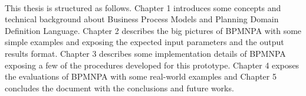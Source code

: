 \paragraph{}
This thesis is structured as follows. 
Chapter 1 introduces some concepts and technical background about Business Process Models and Planning Domain Definition Language. Chapter 2 describes the big pictures of BPMNPA with some simple examples and exposing the expected input parameters and the output results format. Chapter 3 describes some  implementation details of BPMNPA exposing a few of the procedures developed for this prototype. Chapter 4 exposes the evaluations of BPMNPA with some real-world examples and Chapter 5 concludes the document with the conclusions and future works.

